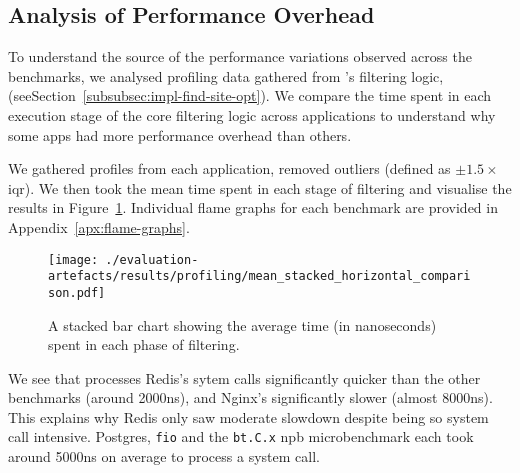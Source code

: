 \subsection{Analysis of Performance Overhead}

To understand the source of the performance variations observed across the
benchmarks, we analysed profiling data gathered from \af's filtering logic,
(seeSection~\ref{subsubsec:impl-find-site-opt}). We compare the time spent in
each execution stage of the core filtering logic across applications to
understand why some apps had more performance overhead than others.

We gathered profiles from each application, removed outliers (defined as
$\pm1.5\times$ \ac{iqr}). We then took the mean time spent in each stage of
filtering and visualise the results in Figure~\ref{fig:profile-means}.
Individual flame graphs for each benchmark are provided in
Appendix~\ref{apx:flame-graphs}.

\begin{figure}[htbp]
    \centering
    \texttt{[image: ./evaluation-artefacts/results/profiling/mean\_stacked\_horizontal\_comparison.pdf]}
    \caption{A stacked bar chart showing the average time (in nanoseconds) \af
    spent in each phase of filtering.}
    \label{fig:profile-means}
\end{figure}

We see that \af processes Redis's sytem calls significantly quicker than the
other benchmarks (around 2000ns), and Nginx's significantly slower (almost
8000ns). This explains why Redis only saw moderate slowdown despite being so 
system call intensive. Postgres, \texttt{fio} and the \texttt{bt.C.x} \ac{npb}
microbenchmark each took around 5000ns on average to process a system call.

